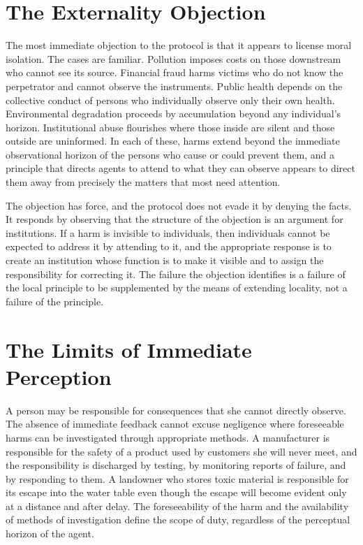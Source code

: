 \documentclass[11pt]{report}
\theoremstyle{definition}
\theoremstyle{remark}
\begin{document}
\section{The Externality Objection}

The most immediate objection to the protocol is that it appears to license moral isolation. The cases are familiar. Pollution imposes costs on those downstream who cannot see its source. Financial fraud harms victims who do not know the perpetrator and cannot observe the instruments. Public health depends on the collective conduct of persons who individually observe only their own health. Environmental degradation proceeds by accumulation beyond any individual's horizon. Institutional abuse flourishes where those inside are silent and those outside are uninformed. In each of these, harms extend beyond the immediate observational horizon of the persons who cause or could prevent them, and a principle that directs agents to attend to what they can observe appears to direct them away from precisely the matters that most need attention.

The objection has force, and the protocol does not evade it by denying the facts. It responds by observing that the structure of the objection is an argument for institutions. If a harm is invisible to individuals, then individuals cannot be expected to address it by attending to it, and the appropriate response is to create an institution whose function is to make it visible and to assign the responsibility for correcting it. The failure the objection identifies is a failure of the local principle to be supplemented by the means of extending locality, not a failure of the principle.

\section{The Limits of Immediate Perception}

A person may be responsible for consequences that she cannot directly observe. The absence of immediate feedback cannot excuse negligence where foreseeable harms can be investigated through appropriate methods. A manufacturer is responsible for the safety of a product used by customers she will never meet, and the responsibility is discharged by testing, by monitoring reports of failure, and by responding to them. A landowner who stores toxic material is responsible for its escape into the water table even though the escape will become evident only at a distance and after delay. The foreseeability of the harm and the availability of methods of investigation define the scope of duty, regardless of the perceptual horizon of the agent.
\end{document}
